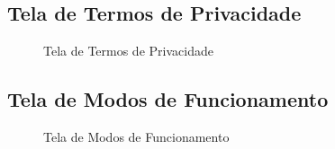 \subsection{Tela de Termos de Privacidade}
\begin{figure}[H]
\centering
{}
\caption{Tela de Termos de Privacidade}
\end{figure}

\subsection{Tela de Modos de Funcionamento}
\begin{figure}[H]
\centering
{}
\caption{Tela de  Modos de Funcionamento}
\end{figure}

